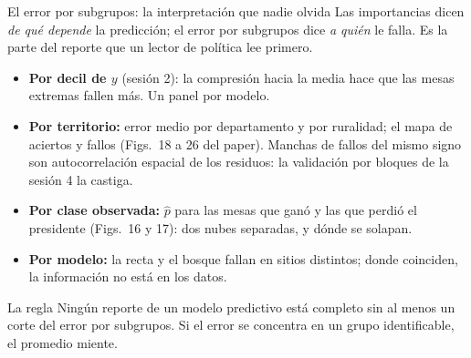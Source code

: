 \documentclass{beamer}
\newcommand{\1}{\mathbb{I}}
\begin{document}
\begin{frame}{El error por subgrupos: la interpretación que nadie olvida}
\small
Las importancias dicen \emph{de qué depende} la predicción; el error por subgrupos dice \emph{a quién} le falla. Es la parte del reporte que un lector de política lee primero.
\pause
\begin{itemize}\itemsep3pt
  \item \textbf{Por decil de $y$} (sesión 2): la compresión hacia la media hace que las mesas extremas fallen más. Un panel por modelo.
  \item \textbf{Por territorio:} error medio por departamento y por ruralidad; el mapa de aciertos y fallos (Figs.\ 18 a 26 del paper). Manchas de fallos del mismo signo son autocorrelación espacial de los residuos: la validación por bloques de la sesión 4 la castiga.
  \item \textbf{Por clase observada:} $\hat{p}$ para las mesas que ganó y las que perdió el presidente (Figs.\ 16 y 17): dos nubes separadas, y dónde se solapan.
  \item \textbf{Por modelo:} la recta y el bosque fallan en sitios distintos; donde coinciden, la información no está en los datos.
\end{itemize}
\pause
\begin{block}{La regla}
Ningún reporte de un modelo predictivo está completo sin al menos un corte del error por subgrupos. Si el error se concentra en un grupo identificable, el promedio miente.
\end{block}
\end{frame}
\end{document}
